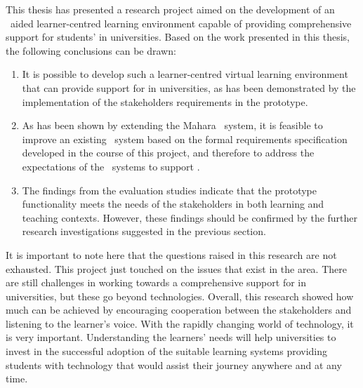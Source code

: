 This thesis has presented a research project aimed on the development of an
\ep~aided learner-centred learning environment capable of providing
comprehensive support for students' \LLLs in universities. Based on the work
presented in this thesis, the following conclusions can be drawn:
\begin{enumerate}
  \item It is possible to develop such a learner-centred virtual learning
  environment that can provide support for \LLLs in universities, as has been
  demonstrated by the implementation of the stakeholders requirements in the
  prototype.
  \item As has been shown by extending the Mahara \ep~system, it is feasible to
  improve an existing \ep~system based on the formal requirements specification
  developed in the course of this project, and therefore to address the
  expectations of the \ep~systems to support \LLLsn.
  \item The findings from the evaluation studies indicate that the prototype
  functionality meets the needs of the stakeholders in both learning and
  teaching contexts. However, these findings should be confirmed by the further
  research investigations suggested in the previous section.
\end{enumerate}

It is important to note here that the questions raised in this research are
not exhausted. This project just touched on the issues that exist in the area.
There are still challenges in working towards a comprehensive support for \LLLs in
universities, but these go beyond technologies. Overall, this research showed
how much can be achieved by encouraging cooperation between the stakeholders and
listening to the learner's voice. With the rapidly changing world of technology,
it is very important. Understanding the learners' needs will help universities
to invest in the successful adoption of the suitable learning systems providing
students with technology that would assist their \LLLs journey anywhere and at
any time.

